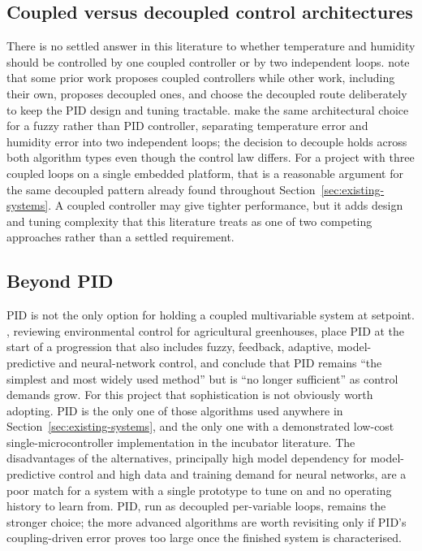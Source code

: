 \subsection{Coupled versus decoupled control architectures}
\label{subsec:coupled-decoupled}

There is no settled answer in this literature to whether temperature and humidity should be controlled by one coupled controller or by two independent loops. \citet{matamoros_temperature_2020} note that some prior work proposes coupled controllers while other work, including their own, proposes decoupled ones, and choose the decoupled route deliberately to keep the PID design and tuning tractable. \citet{riahi_intelligent_2020} make the same architectural choice for a fuzzy rather than PID controller, separating temperature error and humidity error into two independent loops; the decision to decouple holds across both algorithm types even though the control law differs. For a project with three coupled loops on a single embedded platform, that is a reasonable argument for the same decoupled pattern already found throughout Section~\ref{sec:existing-systems}. A coupled controller may give tighter performance, but it adds design and tuning complexity that this literature treats as one of two competing approaches rather than a settled requirement.

\subsection{Beyond PID}
\label{subsec:beyond-pid}

PID is not the only option for holding a coupled multivariable system at setpoint. \citet{chen_review_2025}, reviewing environmental control for agricultural greenhouses, place PID at the start of a progression that also includes fuzzy, feedback, adaptive, model-predictive and neural-network control, and conclude that PID remains ``the simplest and most widely used method'' but is ``no longer sufficient'' as control demands grow. For this project that sophistication is not obviously worth adopting. PID is the only one of those algorithms used anywhere in Section~\ref{sec:existing-systems}, and the only one with a demonstrated low-cost single-microcontroller implementation in the incubator literature. The disadvantages of the alternatives, principally high model dependency for model-predictive control and high data and training demand for neural networks, are a poor match for a system with a single prototype to tune on and no operating history to learn from. PID, run as decoupled per-variable loops, remains the stronger choice; the more advanced algorithms are worth revisiting only if PID's coupling-driven error proves too large once the finished system is characterised.

